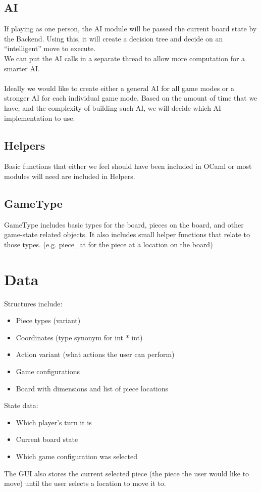 \documentclass[11pt, oneside]{article}
\begin{document}
\subsection{AI}
If playing as one person, the AI module will be passed the current board state
by the Backend. Using this, it will create a decision tree and decide on an
``intelligent'' move
to execute.\\
We can put the AI calls in a separate thread to allow more computation for a
smarter AI.\\\\
Ideally we would like to create either a general AI for all game modes or a
stronger AI for each individual game mode. Based on the amount of time that we
have, and the complexity of building such AI, we will decide which AI
implementation to use.

\subsection{Helpers}
Basic functions that either we feel should have been included in OCaml or most
modules will need are included in Helpers.

\subsection{GameType}
GameType includes basic types for the board, pieces on the board, and other
game-state related objects. It also includes small helper functions that relate
to those types. (e.g. piece\_at for the piece at a location on the board)

\section{Data}
Structures include:
\begin{itemize}
\item Piece types (variant)
\item Coordinates (type synonym for int * int)
\item Action variant (what actions the user can perform)
\item Game configurations
\item Board with dimensions and list of piece locations
\end{itemize}

State data:
\begin{itemize}
\item Which player's turn it is
\item Current board state
\item Which game configuration was selected
\end{itemize}
The GUI also stores the current selected piece (the piece the user would like to
move) until the user selects a location to move it to.
\end{document}
